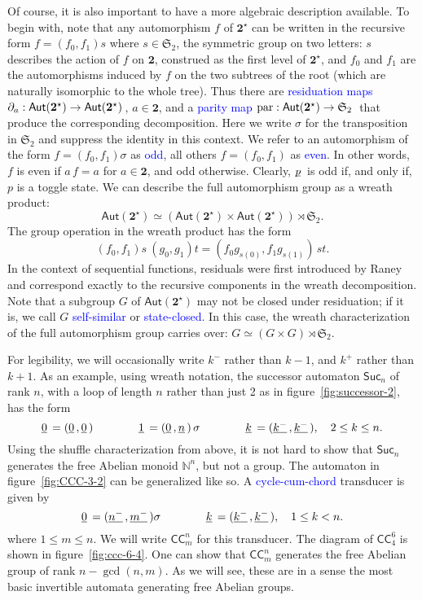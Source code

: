 \documentclass[12pt]{svmult}
\def\emph#1{\textcolor{blue}{#1}}
\def\2{\mathbf{2}}
\def\Aut{\mathsf{Aut}}
\def\CCC#1#2{\mathsf{CC}^{#1}_{#2}}
\def\F#1{\underline{\smash{#1}}\,}       %
\def\SS{\Star{\2}}
\def\SUC#1{\mathsf{Suc}_{#1}}
\def\SymG{\mathfrak{S}}
\def\N{\mathbb{N}}
\def\pari{\mathop{\mathrm{par}}}
\def\post#1{{#1}^{+}}
\def\pre#1{{#1}^{-}}
\def\resid#1#2{\partial_{#1}{#2}}         %
\def\mathcorr{\ifx\next.\mkern -.3mu\else\ifx\next,\mkern -.3mu\else\,\fi\fi}
\def\func#1#2#3{{#1}:{#2}\to{#3}\futurelet\next\mathcorr}
\providecommand{\Star}[1]{{#1}^{\star}}
\begin{document}
Of course, it is also important to have a more algebraic description available. 
To begin with, note that any automorphism $f$ of $\SS$ can be written in the recursive form 
$f = (f_{0},f_{1}) s$ where $s \in \SymG_{2}$, the symmetric group on two letters: 
$s$ describes the action of $f$ on $\2$, construed as the first level of $\SS$, 
and $f_0$ and $f_1$ are the automorphisms induced by $f$ on the two subtrees of the root
(which are naturally isomorphic to the whole tree). 
Thus there are \emph{residuation maps} $\func{\resid{a}{}}{\Aut(\SS)}{\Aut(\SS)}$, 
$a \in \2$, and 
a \emph{parity map} $\func{\pari}{\Aut(\SS)}{\SymG_{2}}$ that produce the corresponding 
decomposition. 
Here we write $\sigma$ for the 
transposition in $\SymG_{2}$ and suppress the identity in this context. 
We refer to an automorphism of the form $f = (f_{0},f_{1})\sigma$  as \emph{odd}, all others
$f = (f_{0},f_{1})$ as \emph{even}.  
In other words, $f$ is even if $a \, f = a$ for $a \in \2$, and odd otherwise. 
Clearly, $\F{p}$ is odd if, and only if, $p$ is a toggle state. 
We can describe the full automorphism group as a wreath product:
%
$$
  \Aut(\SS) \simeq ( \Aut(\SS) \times  \Aut(\SS) ) \rtimes \SymG_{2}.
$$
%
The group operation in the wreath product has the form 
%
$$
  (f_{0},f_{1}) s \: (g_{0},g_{1}) t  = (f_{0} g_{s(0)}, f_{1}g_{s(1)})\, st.
$$
%
In the context of sequential functions, residuals were first introduced by Raney 
\cite{Raney58:sequential_functions} and 
correspond exactly to the recursive components in the wreath decomposition. 
Note that a subgroup $G$ of $\Aut(\SS)$ may not be closed under residuation; 
if it is, we call $G$ \emph{self-similar} or \emph{state-closed}. 
In this case, the wreath characterization of the full automorphism group carries 
over:  $G \simeq ( G \times G ) \rtimes \SymG_{2}$. 

For legibility, we will occasionally write $\pre{k}$ rather than $k-1$, and 
$\post{k}$ rather than $k+1$.  
As an example, using wreath notation, the successor automaton $\SUC{n}$ of rank $n$, with a 
loop of length $n$ rather than just 2 as in figure~\ref{fig:successor-2}, has the form 
%
$$
   \F{0} =  (\F{0},\F{0})       \qquad\qquad
   \F{1} =  (\F{0},\F{n}) \, \sigma \qquad\qquad
   \F{k} =  (\F{\pre{k}},\F{\pre{k}}), \quad 2 \leq  k \leq  n.
$$
%
Using the shuffle characterization from above, it is not hard to show that $\SUC{n}$ 
generates the free Abelian monoid $\N^{n}$, but not a group. 
%
The automaton in figure~\ref{fig:CCC-3-2} can be generalized like so.
A \emph{cycle-cum-chord} transducer is given by
%
$$
   \F{0} =  (\F{\pre{n}},\F{\pre{m}})\sigma      \qquad\qquad
   \F{k} =  (\F{\pre{k}},\F{\pre{k}}),     \quad 1 \leq  k < n.
$$
%
where $1 \leq m \leq n$. 
We will write $\CCC{n}{m}$ for this transducer. 
The diagram of $\CCC{6}{4}$ is shown in figure~\ref{fig:ccc-6-4}.
One can show that  $\CCC{n}{m}$ generates the free Abelian group of rank 
$n - \gcd(n,m)$. 
As we will see, these are in a sense the most basic invertible automata 
generating free Abelian groups. 
\end{document}
